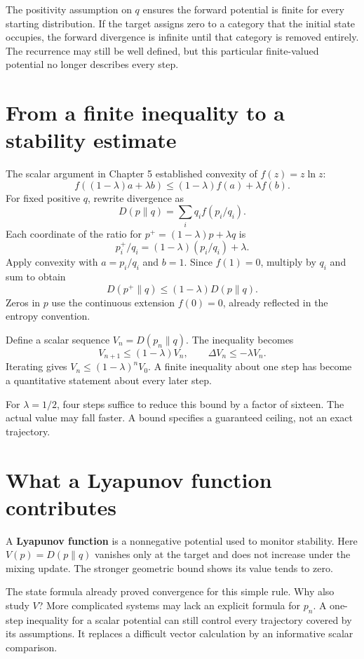 \documentclass[11pt,oneside,openany]{book}
\theoremstyle{definition}
\theoremstyle{remark}
\numberwithin{equation}{chapter}
\begin{document}
The positivity assumption on \(q\) ensures the forward potential is finite for every starting distribution. If the target assigns zero to a category that the initial state occupies, the forward divergence is infinite until that category is removed entirely. The recurrence may still be well defined, but this particular finite-valued potential no longer describes every step.

\section{From a finite inequality to a stability estimate}\label{ch06-from-a-finite-inequality-to-a-stability-estimate}

The scalar argument in Chapter 5 established convexity of \(f(z)=z\ln z\): \[f((1-\lambda)a+\lambda b)
\leq(1-\lambda)f(a)+\lambda f(b).\] For fixed positive \(q\), rewrite divergence as \[D(p\|q)=\sum_i q_i f(p_i/q_i).\] Each coordinate of the ratio for \(p^+=(1-\lambda)p+\lambda q\) is \[p_i^+/q_i=(1-\lambda)(p_i/q_i)+\lambda.\] Apply convexity with \(a=p_i/q_i\) and \(b=1\). Since \(f(1)=0\), multiply by \(q_i\) and sum to obtain \[\boxed{D(p^+\|q)\leq(1-\lambda)D(p\|q).}\] Zeros in \(p\) use the continuous extension \(f(0)=0\), already reflected in the entropy convention.

Define a scalar sequence \(V_n=D(p_n\|q)\). The inequality becomes \[V_{n+1}\leq(1-\lambda)V_n,\qquad
\Delta V_n\leq-\lambda V_n.\] Iterating gives \(V_n\leq(1-\lambda)^nV_0\). A finite inequality about one step has become a quantitative statement about every later step.

For \(\lambda=1/2\), four steps suffice to reduce this bound by a factor of sixteen. The actual value may fall faster. A bound specifies a guaranteed ceiling, not an exact trajectory.

\section{What a Lyapunov function contributes}\label{ch06-what-a-lyapunov-function-contributes}

A \textbf{Lyapunov function} is a nonnegative potential used to monitor stability. Here \(V(p)=D(p\|q)\) vanishes only at the target and does not increase under the mixing update. The stronger geometric bound shows its value tends to zero.

The state formula already proved convergence for this simple rule. Why also study \(V\)? More complicated systems may lack an explicit formula for \(p_n\). A one-step inequality for a scalar potential can still control every trajectory covered by its assumptions. It replaces a difficult vector calculation by an informative scalar comparison.
\end{document}
